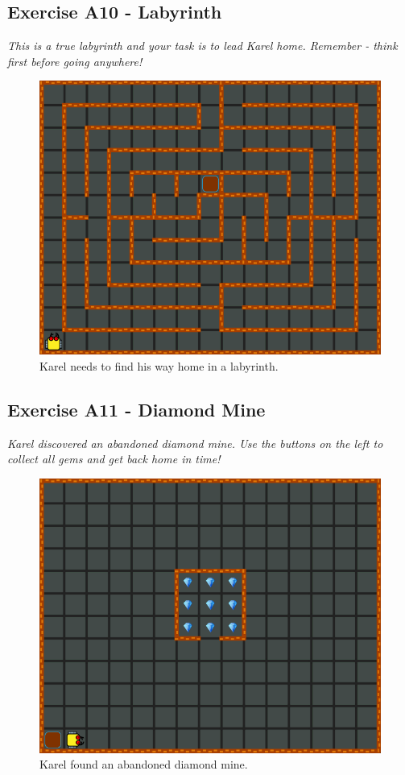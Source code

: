 \subsection{Exercise A10 - Labyrinth}

{\em This is a true labyrinth and your task is to lead Karel 
home. Remember - think first before going anywhere!}

\begin{figure}[!ht]
\begin{center}
\includegraphics[height=0.4\textwidth]{imgk/a10.png}
\end{center}
\vspace{-4mm}
\caption{Karel needs to find his way home in a labyrinth.}
\label{fig:a10}
\vspace{-4mm}
\end{figure}
\noindent


\subsection{Exercise A11 - Diamond Mine}

{\em Karel discovered an abandoned diamond mine. Use the buttons
on the left to collect all gems and get back home in time!}

\begin{figure}[!ht]
\begin{center}
\includegraphics[height=0.4\textwidth]{imgk/a11.png}
\end{center}
\vspace{-4mm}
\caption{Karel found an abandoned diamond mine.}
\label{fig:a11}
\vspace{-10mm}
\end{figure}
\newpage
\noindent

